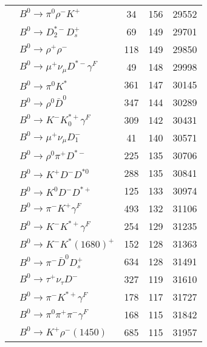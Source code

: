 \documentclass[landscape]{article}
\newcounter{rownumbers}
\newcommand\rn{\stepcounter{rownumbers}\arabic{rownumbers}}
\newcommand{\EOL}{\\} %
\newcommand{\topoTags}[1]{#1} %
\begin{document}
\begin{longtable}{clccc}
\rn & $ B^{0} \rightarrow \pi^{0} \rho^{-} K^{+} $ & \topoTags{34 & }156 & 29552 \EOL

\rn & $ B^{0} \rightarrow D_{2}^{*-} D_{s}^{+} $ & \topoTags{69 & }149 & 29701 \EOL

\rn & $ B^{0} \rightarrow \rho^{+} \rho^{-} $ & \topoTags{118 & }149 & 29850 \EOL

\rn & $ B^{0} \rightarrow \mu^{+} \nu_{\mu} D^{*-} \gamma^{F} $ & \topoTags{49 & }148 & 29998 \EOL

\rn & $ B^{0} \rightarrow \pi^{0} K^{*} $ & \topoTags{361 & }147 & 30145 \EOL

\rn & $ B^{0} \rightarrow \rho^{0} \bar{D}^{0} $ & \topoTags{347 & }144 & 30289 \EOL

\rn & $ B^{0} \rightarrow K^{-} K_{0}^{*+} \gamma^{F} $ & \topoTags{309 & }142 & 30431 \EOL

\rn & $ B^{0} \rightarrow \mu^{+} \nu_{\mu} D_{1}^{-} $ & \topoTags{41 & }140 & 30571 \EOL

\rn & $ B^{0} \rightarrow \rho^{0} \pi^{+} D^{*-} $ & \topoTags{225 & }135 & 30706 \EOL

\rn & $ B^{0} \rightarrow K^{+} D^{-} D^{*0} $ & \topoTags{288 & }135 & 30841 \EOL

\rn & $ B^{0} \rightarrow K^{0} D^{-} D^{*+} $ & \topoTags{125 & }133 & 30974 \EOL

\rn & $ B^{0} \rightarrow \pi^{-} K^{+} \gamma^{F} $ & \topoTags{493 & }132 & 31106 \EOL

\rn & $ B^{0} \rightarrow K^{-} K^{*+} \gamma^{F} $ & \topoTags{254 & }129 & 31235 \EOL

\rn & $ B^{0} \rightarrow K^{-} K^{*}(1680)^{+} $ & \topoTags{152 & }128 & 31363 \EOL

\rn & $ B^{0} \rightarrow \pi^{-} \bar{D}^{0} D_{s}^{+} $ & \topoTags{634 & }128 & 31491 \EOL

\rn & $ B^{0} \rightarrow \tau^{+} \nu_{\tau} D^{-} $ & \topoTags{327 & }119 & 31610 \EOL

\rn & $ B^{0} \rightarrow \pi^{-} K^{*+} \gamma^{F} $ & \topoTags{178 & }117 & 31727 \EOL

\rn & $ B^{0} \rightarrow \pi^{0} \pi^{+} \pi^{-} \gamma^{F} $ & \topoTags{168 & }115 & 31842 \EOL

\rn & $ B^{0} \rightarrow K^{+} \rho^{-}(1450) $ & \topoTags{685 & }115 & 31957 \EOL


\end{longtable}
\end{document}
